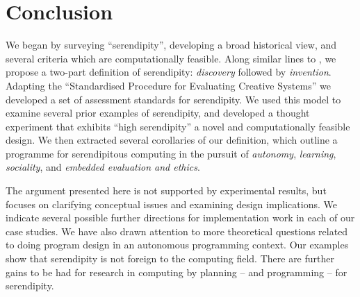 \section{Conclusion} \label{sec:conclusion}

%
We began by surveying ``serendipity'', developing a broad historical
view, and several criteria which are computationally feasible.  Along
similar lines to , we propose a two-part
definition of serendipity: \emph{discovery} followed by
\emph{invention}.
%
Adapting the ``Standardised Procedure for Evaluating Creative
Systems'' we developed a set of assessment standards for serendipity.
%
We used this model to examine several prior examples of serendipity,
and developed a thought experiment that exhibits ``high serendipity''
a novel and computationally feasible design.
%
We then extracted several corollaries of our definition, which outline
a programme for serendipitous computing in the pursuit of
\emph{autonomy}, \emph{learning}, \emph{sociality}, and \emph{embedded
  evaluation and ethics}.

The argument presented here is not supported by experimental results,
but focuses on clarifying conceptual issues and examining design
implications.
% 
We indicate several possible further directions for implementation
work in each of our case studies.  We have also drawn attention to
more theoretical questions related to doing program design in an
autonomous programming context.  Our examples show that serendipity is
not foreign to the computing field.  There are further gains to be had
for research in computing by planning -- and programming -- for
serendipity.
%

